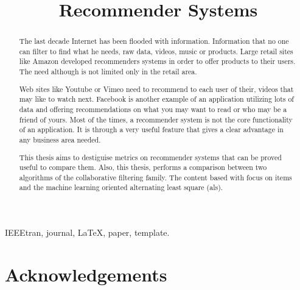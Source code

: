 \documentclass[10pt,journal]{IEEEtran}
\begin{document}
	
	\title{Recommender Systems} %
	\author{
		}
	\maketitle
	\begin{abstract}
		The last decade Internet has been flooded with information. Information that no one can filter to find what he needs, raw data, videos, music or products. Large retail sites like Amazon developed recommenders systems in order to offer products to their users. The need although is not limited only in the retail area. 
		
		Web sites like Youtube or Vimeo need to recommend to each user of their, videos that may like to watch next. Facebook is another example of an application utilizing lots of data and offering recommendations on what you may want to read or who may be a friend of yours. Most of the times, a recommender system is not the core functionality of an application. It is through a very useful feature that gives a clear advantage in any business area needed.
		
		This thesis aims to destiguise metrics on recommender systems  that can be proved useful to compare them. Also, this thesis, performs a comparison between two algorithms of the collaborative filtering family. The content based with focus on items and the machine learning oriented alternating least square (als).
	\end{abstract}
	\begin{IEEEkeywords}
		IEEEtran, journal, \LaTeX, paper, template.
	\end{IEEEkeywords}

	
	
	
	
	
	

	\section{Acknowledgements}
	
\end{document}
